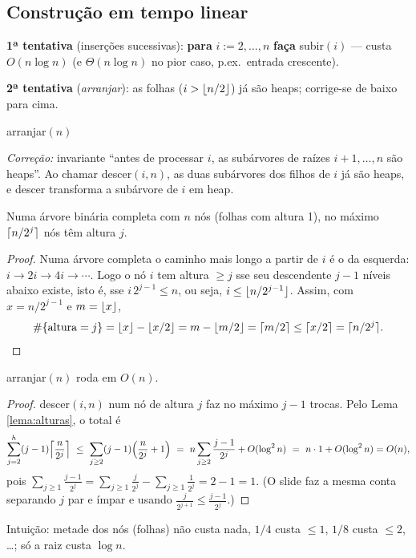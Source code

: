 \subsection{Construção em tempo linear}
\textbf{1ª tentativa} (inserções sucessivas): \textbf{para} $i:=2,\dots,n$ \textbf{faça} subir$(i)$ --- custa $O(n\log n)$ (e $\Theta(n\log n)$ no pior caso, p.ex.\ entrada crescente).

\textbf{2ª tentativa} (\emph{arranjar}): as folhas ($i>\lfloor n/2\rfloor$) já são heaps; corrige-se de baixo para cima.
\begin{pseudo}{arranjar$(n)$}
\begin{algorithmic}
   \State {} \EndFor
\EndProcedure
\end{algorithmic}
\end{pseudo}
\emph{Correção:} invariante ``antes de processar $i$, as subárvores de raízes $i+1,\dots,n$ são heaps''. Ao chamar descer$(i,n)$, as duas subárvores dos filhos de $i$ já são heaps, e descer transforma a subárvore de $i$ em heap.

\begin{lema}\label{lema:alturas}
Numa árvore binária completa com $n$ nós (folhas com altura 1), no máximo $\lceil n/2^j\rceil$ nós têm altura $j$.
\end{lema}
\begin{proof}
Numa árvore completa o caminho mais longo a partir de $i$ é o da esquerda: $i\to 2i\to 4i\to\cdots$. Logo o nó $i$ tem altura $\ge j$ sse seu descendente $j-1$ níveis abaixo existe, isto é, sse $i\,2^{j-1}\le n$, ou seja, $i\le\lfloor n/2^{j-1}\rfloor$. Assim, com $x=n/2^{j-1}$ e $m=\lfloor x\rfloor$,
\[
\#\{\text{altura}=j\}=\lfloor x\rfloor-\lfloor x/2\rfloor=m-\lfloor m/2\rfloor=\lceil m/2\rceil\le\lceil x/2\rceil=\lceil n/2^j\rceil.\qedhere
\]
\end{proof}

\begin{teo}
arranjar$(n)$ roda em $O(n)$.
\end{teo}
\begin{proof}
descer$(i,n)$ num nó de altura $j$ faz no máximo $j-1$ trocas. Pelo Lema \ref{lema:alturas}, o total é
\[
\sum_{j=2}^{h}(j-1)\ceil*{\frac{n}{2^j}}\ \le\ \sum_{j\ge2}(j-1)\Bigl(\frac{n}{2^j}+1\Bigr)
\ =\ n\sum_{j\ge2}\frac{j-1}{2^j}+O(\log^2 n)\ =\ n\cdot 1+O(\log^2n)=O(n),
\]
pois $\sum_{j\ge1}\frac{j-1}{2^j}=\sum_{j\ge1}\frac{j}{2^j}-\sum_{j\ge1}\frac1{2^j}=2-1=1$. (O slide faz a mesma conta separando $j$ par e ímpar e usando $\frac{j}{2^{j+1}}\le\frac{j-1}{2^j}$.)
\end{proof}
Intuição: metade dos nós (folhas) não custa nada, $1/4$ custa $\le1$, $1/8$ custa $\le2$, \ldots; só a raiz custa $\log n$.

